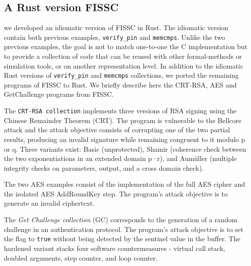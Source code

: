 \subsection{A Rust version FISSC}
we developed an idiomatic version of FISSC in Rust. The idiomatic version contain both previous examples, \texttt{verify\_pin} and \texttt{memcmps}.
Unlike the two previous examples, the goal is not to match one-to-one the C implementation but to provide a collection of code that can be reused with other formal-methods or simulation tools, or on another representation level.
In addition to the idiomatic Rust versions of \texttt{verify\_pin} and \texttt{memcmps} collections, we ported the remaining programs of FISSC to Rust.
We briefly describe here the CRT-RSA, AES and GetChallenge programs from FISSC.

The \texttt{CRT-RSA collection} implements three versions of RSA signing using the Chinese Remainder Theorem (CRT).
The program is vulnerable to the Bellcore attack and the attack objective consists of corrupting one of the two partial results, producing an invalid signature while remaining congruent to it modulo p or q. Three variants exist: Basic (unprotected), Shamir (coherence check between the two exponentiations in an extended domain p·r), and Aumüller (multiple integrity checks on parameters, output, and a cross domain check).

The two AES examples consist of the implementation of the full AES cipher and the isolated AES AddRoundKey step. The program's attack objective is to generate an invalid ciphertext.

The \textit{Get Challenge collection} (GC) corresponds to the generation of a random challenge in an authentication protocol. The program's attack objective is to set the flag to \texttt{true} without being detected by the sentinel value in the buffer.
The hardened variant stacks four software countermeasures - virtual call stack, doubled arguments, step counter, and loop counter.